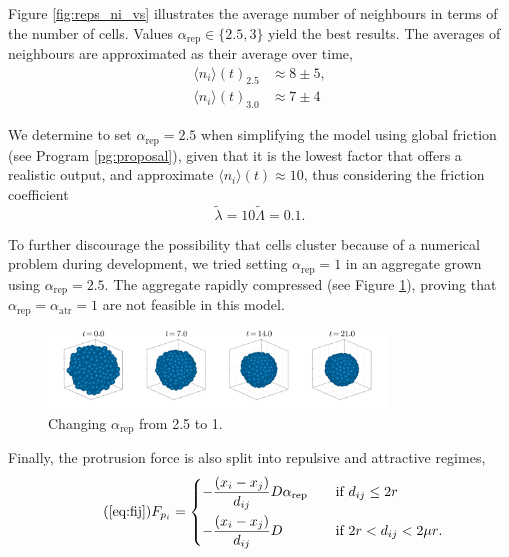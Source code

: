 Figure \ref{fig:reps_ni_vs} illustrates the average number of neighbours in terms of the number of cells. Values $\alpha_\text{rep}\in\{2.5,3\}$ yield the best results. The averages of neighbours are approximated as their average over time,
\begin{equation}
    \begin{aligned}
        \langle n_i\rangle(t)_{2.5}&\approx 8 \pm 5,\\
        \langle n_i\rangle(t)_{3.0}&\approx 7 \pm 4
    \end{aligned}
\end{equation}

We determine to set $\alpha_\text{rep}=2.5$ when simplifying the model using global friction (see Program \ref{pg:proposal}), given that it is the lowest factor that offers a realistic output, and approximate $\langle n_i \rangle(t)\approx10$, thus considering the friction coefficient
\begin{equation}
    \tilde\lambda = 10\tilde\Lambda = 0.1.
\end{equation}

To further discourage the possibility that cells cluster because of a numerical problem during development, we tried setting $\alpha_\text{rep}=1$ in an aggregate grown using $\alpha_\text{rep}=2.5$. The aggregate rapidly compressed (see Figure \ref{fig:aggregate_revert}), proving that $\alpha_\text{rep}=\alpha_\text{atr}=1$ are not feasible in this model.

\begin{figure}[ht]
    \centering
    \includegraphics[width=0.8\textwidth]{figures/303/303-aggregate-revert-titles.png}
    \caption{Changing $\alpha_\text{rep}$ from 2.5 to 1.}
    \label{fig:aggregate_revert}
\end{figure}

Finally, the protrusion force is also split into repulsive and attractive regimes,
\begin{equation}\tag{\ref{eq:fij}}
    F_{p_i}=
    \begin{dcases}
        - \frac{(x_i-x_j)}{d_{ij}} D \alpha_\text{rep}
        &\quad \text{if $d_{ij}\leq 2 r$} \\
        - \frac{(x_i-x_j)}{d_{ij}} D
        &\quad \text{if $2r<d_{ij}<2\mu r$}.
    \end{dcases}
\end{equation}

